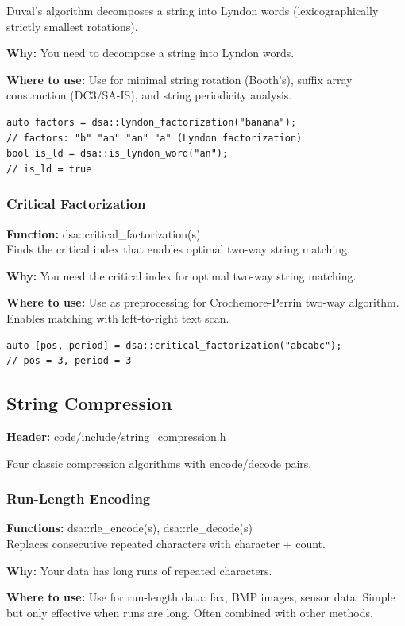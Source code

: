 \documentclass[11pt]{article}
\begin{document}
Duval's algorithm decomposes a string into Lyndon words (lexicographically strictly smallest rotations).

\textbf{Why:} You need to decompose a string into Lyndon words. \par \textbf{Where to use:} Use for minimal string rotation (Booth's), suffix array construction (DC3/SA-IS), and string periodicity analysis.

\begin{lstlisting}
auto factors = dsa::lyndon_factorization("banana");
// factors: "b" "an" "an" "a" (Lyndon factorization)
bool is_ld = dsa::is_lyndon_word("an");
// is_ld = true
\end{lstlisting}

\subsubsection{Critical Factorization}
\textbf{Function:} dsa::critical\_factorization(s)\\

Finds the critical index that enables optimal two-way string matching.

\textbf{Why:} You need the critical index for optimal two-way string matching. \par \textbf{Where to use:} Use as preprocessing for Crochemore-Perrin two-way algorithm. Enables matching with left-to-right text scan.

\begin{lstlisting}
auto [pos, period] = dsa::critical_factorization("abcabc");
// pos = 3, period = 3
\end{lstlisting}

\subsection{String Compression}
\textbf{Header:} code/include/string\_compression.h

Four classic compression algorithms with encode/decode pairs.

\subsubsection{Run-Length Encoding}
\textbf{Functions:} dsa::rle\_encode(s), dsa::rle\_decode(s)\\

Replaces consecutive repeated characters with character + count.

\textbf{Why:} Your data has long runs of repeated characters. \par \textbf{Where to use:} Use for run-length data: fax, BMP images, sensor data. Simple but only effective when runs are long. Often combined with other methods.
\end{document}
